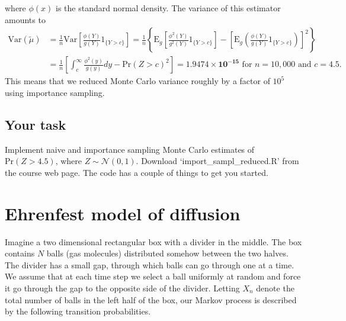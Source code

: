 \documentclass[11pt]{article}
\numberwithin{algorithm}{section}
\theoremstyle{remark}
\theoremstyle{definition}
\numberwithin{equation}{section}
\numberwithin{figure}{section}
\begin{document}
  where $\phi(x)$ is the standard normal density. The variance of this estimator amounts to 
  \begin{equation*}
    \begin{split}
      \text{Var}(\tilde{\mu}) &= \frac{1}{n} \text{Var}\left[ 
        \frac{\phi(Y)}{g(Y)}1_{\{Y > c\}}\right] = 
      \frac{1}{n}\left\{\text{E}_g\left[\frac{\phi^2(Y)}{g^2(Y)}1_{\{Y > c\}}\right] 
        - \left[\text{E}_g\left(\frac{\phi(Y)}{g(Y)}1_{\{Y > c\}}\right)\right]^2\right\} \\ 
      &=\frac{1}{n}\left[\int_c^\infty \frac{\phi^2(y)}{g(y)}dy - \text{Pr}(Z > c)^2\right] 
      = \mathbf{1.9474\times 10^{-15}} \text{ for } n=10,000 \text{ and } c=4.5.
    \end{split}
  \end{equation*}
  This means that we reduced Monte Carlo variance roughly by a factor of $10^5$ using importance 
  sampling.


\subsection*{Your task}
Implement naive and importance sampling Monte Carlo estimates of $\text{Pr}(Z>4.5)$, where
$Z \sim \mathcal{N}(0,1)$. Download `import\_sampl\_reduced.R' from 
the course web page. The code has a couple of things to get you started.

\section*{Ehrenfest model of diffusion}
Imagine a two dimensional rectangular box with a divider in the middle. The box contains $N$ balls
(gas molecules)  distributed somehow between the two halves. The divider has a small gap, through which 
balls can go through one at a time. We assume that at each time step we select a ball uniformly at 
random and force it go through the gap to the opposite side of the divider. Letting $X_n$ denote
the total number of balls in the left half of the box, our Markov process is described by the 
following transition probabilities.
\end{document}
